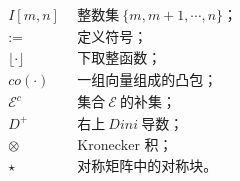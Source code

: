 \begin{eqnarray*}
&I[m,n] &~~\mbox{整数集}~\{m,m+1,\cdots,n\}\mbox{；}\\
&:= &~~\mbox{定义符号；}\\
&\lfloor\cdot\rfloor &~~\mbox{下取整函数；}\\
&co(\cdot) &~~\mbox{一组向量组成的凸包；}\\
& \mathcal{E}^c &~~\mbox{集合}~\mathcal{E}~\mbox{的补集；}\\
& D^+  &~~\mbox{右上}~Dini~\mbox{导数；} \\
&\otimes &~~\mbox{Kronecker~积；}\\
&\star &~~\mbox{对称矩阵中的对称块。}\\
\end{eqnarray*}

